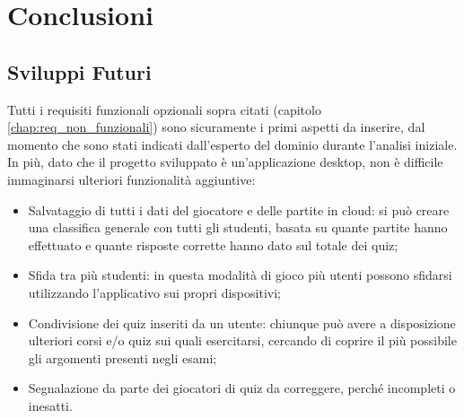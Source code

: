

\chapter{Conclusioni}\label{conclusioni}

    \section{Sviluppi Futuri}
    Tutti i requisiti funzionali opzionali sopra citati (capitolo \ref{chap:req_non_funzionali}) sono sicuramente i primi aspetti da inserire, dal momento che sono stati indicati dall'esperto del dominio durante l'analisi iniziale.
   In più, dato che il progetto sviluppato è un'applicazione desktop, non è difficile immaginarsi ulteriori funzionalità aggiuntive:
    
    \begin{itemize}
        \item Salvataggio di tutti i dati del giocatore e delle partite in cloud: si può creare una classifica generale con tutti gli studenti, basata su quante partite hanno effettuato e quante risposte corrette hanno dato sul totale dei quiz;
    
        \item Sfida tra più studenti: in questa modalità di gioco più utenti possono sfidarsi utilizzando l'applicativo sui propri dispositivi;
        
        \item Condivisione dei quiz inseriti da un utente: chiunque può avere a disposizione ulteriori corsi e/o quiz sui quali esercitarsi, cercando di coprire il più possibile gli argomenti presenti negli esami;
        
        \item Segnalazione da parte dei giocatori di quiz da correggere, perché incompleti o inesatti.
    \end{itemize}
    
    

    
    